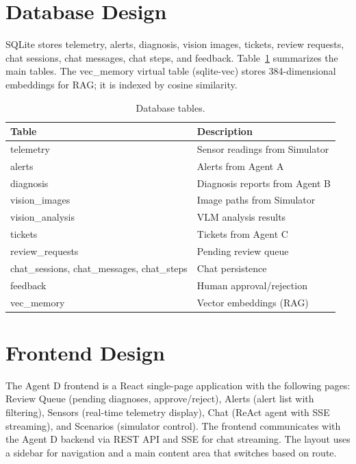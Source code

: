 \documentclass[12pt,letterpaper]{report}
\begin{document}
\section{Database Design}

SQLite stores telemetry, alerts, diagnosis, vision images, tickets, review requests, chat sessions, chat messages, chat steps, and feedback. Table~\ref{tab:db} summarizes the main tables. The vec\_memory virtual table (sqlite-vec) stores 384-dimensional embeddings for RAG; it is indexed by cosine similarity.

\begin{table}[htbp]
\centering
\caption{Database tables.}
\label{tab:db}
\begin{tabular}{ll}
\toprule
\textbf{Table} & \textbf{Description} \\
\midrule
telemetry & Sensor readings from Simulator \\
alerts & Alerts from Agent A \\
diagnosis & Diagnosis reports from Agent B \\
vision\_images & Image paths from Simulator \\
vision\_analysis & VLM analysis results \\
tickets & Tickets from Agent C \\
review\_requests & Pending review queue \\
chat\_sessions, chat\_messages, chat\_steps & Chat persistence \\
feedback & Human approval/rejection \\
vec\_memory & Vector embeddings (RAG) \\
\bottomrule
\end{tabular}
\end{table}

\section{Frontend Design}

The Agent D frontend is a React single-page application with the following pages: Review Queue (pending diagnoses, approve/reject), Alerts (alert list with filtering), Sensors (real-time telemetry display), Chat (ReAct agent with SSE streaming), and Scenarios (simulator control). The frontend communicates with the Agent D backend via REST API and SSE for chat streaming. The layout uses a sidebar for navigation and a main content area that switches based on route.

\end{document}
